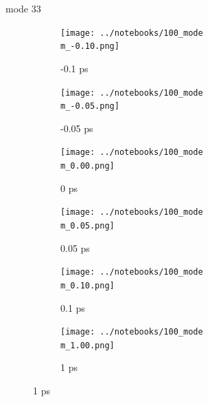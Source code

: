 \documentclass{beamer}
\newcommand\w{0.32}
\begin{document}
\renewcommand\m{33}
\begin{frame}{mode \m}
	\begin{figure}
		\centering
		\begin{subfigure}[b]{\w\textwidth}
			\centering
			\texttt{[image: ../notebooks/100\_mode\\m\_-0.10.png]}
			\caption{-0.1 ps}
		\end{subfigure}
		\begin{subfigure}[b]{\w\textwidth}
			\centering
			\texttt{[image: ../notebooks/100\_mode\\m\_-0.05.png]}
			\caption{-0.05 ps}
		\end{subfigure}
		\begin{subfigure}[b]{\w\textwidth}
			\centering
			\texttt{[image: ../notebooks/100\_mode\\m\_0.00.png]}
			\caption{0 ps}
		\end{subfigure}
		\begin{subfigure}[b]{\w\textwidth}
			\centering
			\texttt{[image: ../notebooks/100\_mode\\m\_0.05.png]}
			\caption{0.05 ps}
		\end{subfigure}
		\begin{subfigure}[b]{\w\textwidth}
			\centering
			\texttt{[image: ../notebooks/100\_mode\\m\_0.10.png]}
			\caption{0.1 ps}
		\end{subfigure}
		\begin{subfigure}[b]{\w\textwidth}
			\centering
			\texttt{[image: ../notebooks/100\_mode\\m\_1.00.png]}
			\caption{1 ps}
		\end{subfigure}
	\end{figure}
\end{frame}
\end{document}
